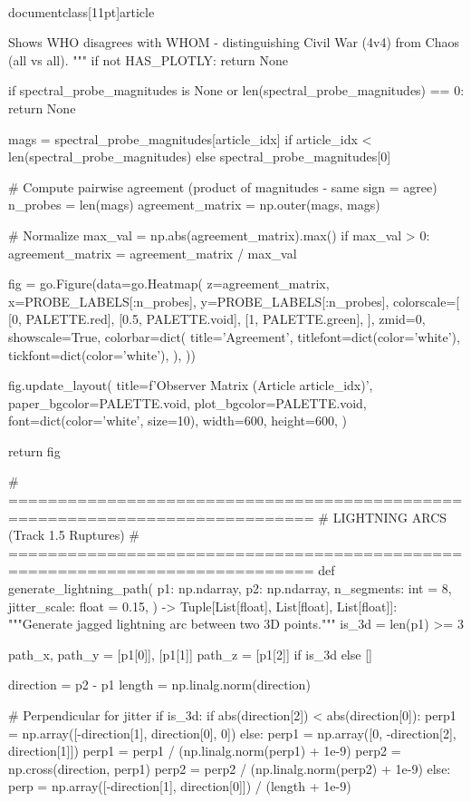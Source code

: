\\documentclass[11pt]{article}
\begin{document}
\begin{CodeBlock}
{{    Shows WHO disagrees with WHOM - distinguishing Civil War (4v4) from Chaos (all vs all).
    """
    if not HAS_PLOTLY:
        return None

    if spectral_probe_magnitudes is None or len(spectral_probe_magnitudes) == 0:
        return None

    mags = spectral_probe_magnitudes[article_idx] if article_idx < len(spectral_probe_magnitudes) else spectral_probe_magnitudes[0]

    # Compute pairwise agreement (product of magnitudes - same sign = agree)
    n_probes = len(mags)
    agreement_matrix = np.outer(mags, mags)

    # Normalize
    max_val = np.abs(agreement_matrix).max()
    if max_val > 0:
        agreement_matrix = agreement_matrix / max_val

    fig = go.Figure(data=go.Heatmap(
        z=agreement_matrix,
        x=PROBE_LABELS[:n_probes],
        y=PROBE_LABELS[:n_probes],
        colorscale=[
            [0, PALETTE.red],
            [0.5, PALETTE.void],
            [1, PALETTE.green],
        ],
        zmid=0,
        showscale=True,
        colorbar=dict(
            title='Agreement',
            titlefont=dict(color='white'),
            tickfont=dict(color='white'),
        ),
    ))

    fig.update_layout(
        title=f'Observer Matrix (Article {article_idx})',
        paper_bgcolor=PALETTE.void,
        plot_bgcolor=PALETTE.void,
        font=dict(color='white', size=10),
        width=600,
        height=600,
    )

    return fig


# =============================================================================
# LIGHTNING ARCS (Track 1.5 Ruptures)
# =============================================================================
def generate_lightning_path(
    p1: np.ndarray,
    p2: np.ndarray,
    n_segments: int = 8,
    jitter_scale: float = 0.15,
) -> Tuple[List[float], List[float], List[float]]:
    """Generate jagged lightning arc between two 3D points."""
    is_3d = len(p1) >= 3

    path_x, path_y = [p1[0]], [p1[1]]
    path_z = [p1[2]] if is_3d else []

    direction = p2 - p1
    length = np.linalg.norm(direction)

    # Perpendicular for jitter
    if is_3d:
        if abs(direction[2]) < abs(direction[0]):
            perp1 = np.array([-direction[1], direction[0], 0])
        else:
            perp1 = np.array([0, -direction[2], direction[1]])
        perp1 = perp1 / (np.linalg.norm(perp1) + 1e-9)
        perp2 = np.cross(direction, perp1)
        perp2 = perp2 / (np.linalg.norm(perp2) + 1e-9)
    else:
        perp = np.array([-direction[1], direction[0]]) / (length + 1e-9)

}}
\end{CodeBlock}
\end{document}

